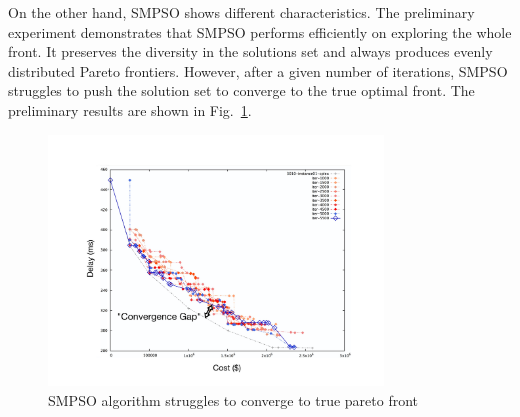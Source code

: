 \documentclass[10pt,journal,compsoc]{IEEEtran}
\newcommand{\Fig}[1]{Fig.~\ref{#1}}
\begin{document}
On the other hand, SMPSO shows different characteristics. The preliminary experiment demonstrates that SMPSO performs efficiently on exploring the whole front. It preserves the diversity in the solutions set and always produces evenly distributed Pareto frontiers. However, after a given number of iterations, SMPSO struggles to push the solution set to converge to the true optimal front. 
The preliminary results are shown in \Fig{smpsolabel}.
\begin{figure}[ht]
\centerline{\includegraphics[page=1,width=3.5in]{SMPSO_iterationtest_label.pdf}}
\caption{SMPSO algorithm struggles to converge to true pareto front} 
\label{smpsolabel}
\end{figure}
\end{document}
